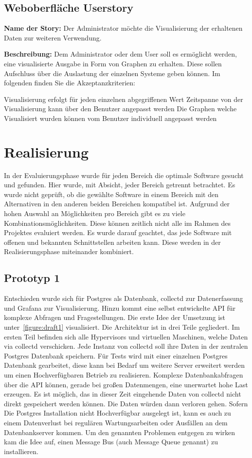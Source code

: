 \section{Weboberfläche Userstory}
\textbf{Name der Story:} Der Administrator möchte die Visualisierung der
erhaltenen Daten zur weiteren Verwendung.

\textbf{Beschreibung:} Dem Administrator oder dem User soll es ermöglicht
werden, eine visualisierte Ausgabe in Form von Graphen zu erhalten. Diese
sollen Aufschluss über die Auslastung der einzelnen Systeme geben können. Im
folgenden finden Sie die Akzeptanzkriterien:

\begin{outline}
  \1 Visualisierung erfolgt für jeden einzelnen abgegriffenen Wert
  \1 Zeitspanne von der Visualisierung kann über den Benutzer angepasst werden
  \1 Die Graphen welche Visualisiert wurden können vom Benutzer individuell
  angepasst werden
\end{outline}
\mr%

\chapter{Realisierung}
In der Evaluierungsphase wurde für jeden Bereich die optimale Software gesucht
und gefunden. Hier wurde, mit Absicht, jeder Bereich getrennt betrachtet. Es
wurde nicht geprüft, ob die gewählte Software in einem Bereich mit den
Alternativen in den anderen beiden Bereichen kompatibel ist. Aufgrund der hohen
Auswahl an Möglichkeiten pro Bereich gibt es zu viele
Kombinationsmöglichkeiten. Diese können zeitlich nicht alle im Rahmen des
Projektes evaluiert werden. Es wurde darauf geachtet, das jede Software mit
offenen und bekannten Schnittstellen arbeiten kann. Diese werden in der
Realisierungsphase miteinander kombiniert.

\section{Prototyp 1}
Entschieden wurde sich für Postgres als Datenbank, collectd zur Datenerfassung
und Grafana zur Visualisierung. Hinzu kommt eine selbst entwickelte API für
komplexe Abfragen und Fragestellungen. Die erste Idee der Umsetzung ist
unter~\ref{figure:draft1} visualisiert. Die Architektur ist in drei Teile
gegliedert. Im ersten Teil befinden sich alle Hypervisors und virtuellen
Maschinen, welche Daten via collectd verschicken. Jede Instanz von collectd
soll ihre Daten in der zentralen Postgres Datenbank speichern. Für Tests wird
mit einer einzelnen Postgres Datenbank gearbeitet, diese kann bei Bedarf um
weitere Server erweitert werden um einen Hochverfügbaren Betrieb zu
realisieren. Komplexe Datenbankabfragen über die API können, gerade bei großen
Datenmengen, eine unerwartet hohe Last erzeugen. Es ist möglich, das in dieser
Zeit eingehende Daten von collectd nicht direkt gespeichert werden können. Die
Daten würden dann verloren gehen. Sofern Die Postgres Installation nicht
Hochverfügbar ausgelegt ist, kann es auch zu einem Datenverlust bei regulären
Wartungsarbeiten oder Ausfällen an dem Datenbankserver kommen. Um den genannten
Problemen entgegen zu wirken kam die Idee auf, einen Message Bus (auch Message
Queue genannt) zu installieren.
\tm%

